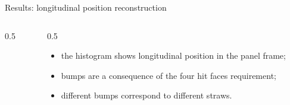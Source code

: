 \documentclass{beamer}[10pt]
\begin{document}
\begin{frame}{Results: longitudinal position reconstruction}
\begin{columns}
\begin{column}{0.5\framewidth}
    \end{column}
    \begin{column}{0.5\framewidth}
      \begin{itemize}
        \item the histogram shows longitudinal position in the panel frame;
        \vspace{3mm}
      \item bumps are a consequence
      of the four hit faces requirement;
        \vspace{3mm}
      \item different bumps
      correspond to different straws.
      \end{itemize}
    \end{column}
  \end{columns}
\end{frame}
\end{document}
